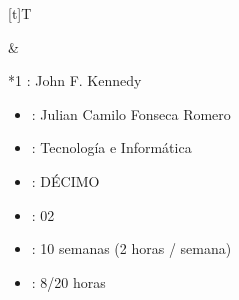 \documentclass[letterpaper,10pt,spanish]{sphinxmanual}
\begin{document}
\begin{savenotes}\sphinxattablestart
\sphinxthistablewithglobalstyle
\centering
\begin{tabular}[t]{}
\sphinxtoprule
\sphinxtableatstartofbodyhook

\begin{savenotes}\sphinxattablestart
\sphinxthistablewithglobalstyle
\centering
\begin{tabulary}{\linewidth}[t]{T}
\sphinxtoprule
\sphinxtableatstartofbodyhook
\sphinxAtStartPar
{}
\\
\sphinxbottomrule
\end{tabulary}
\sphinxtableafterendhook\par
\sphinxattableend\end{savenotes}
&

\begin{savenotes}\sphinxattablestart
\sphinxthistablewithglobalstyle
\raggedright
\begin{tabular}[t]{*{1}{}}
\sphinxtoprule
\sphinxtableatstartofbodyhook
\sphinxAtStartPar
{}: John F. Kennedy
\begin{itemize}
\item {} 
\sphinxAtStartPar
{}: Julian Camilo Fonseca Romero

\item {} 
\sphinxAtStartPar
{}: Tecnología e Informática

\item {} 
\sphinxAtStartPar
{}: DÉCIMO

\item {} 
\sphinxAtStartPar
{}: 02

\item {} 
\sphinxAtStartPar
{}: 10 semanas (2 horas / semana)

\item {} 
\sphinxAtStartPar
{}: 8/20 horas

\end{itemize}
\\
\sphinxbottomrule
\end{tabular}
\sphinxtableafterendhook\par
\sphinxattableend\end{savenotes}
\\
\sphinxbottomrule
\end{tabular}
\sphinxtableafterendhook\par
\sphinxattableend\end{savenotes}
\end{document}
